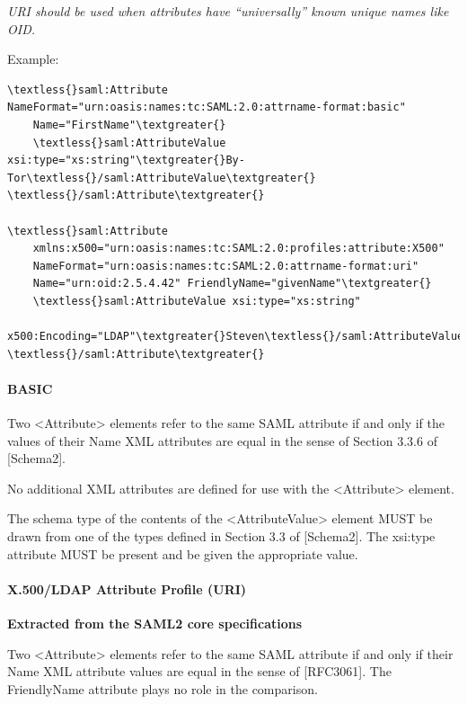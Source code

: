 \documentclass[letterpaper,10pt,english]{sphinxmanual}
\begin{document}
\emph{URI should be used when attributes have ``universally'' known unique names
like OID.}

Example:

\begin{Verbatim}[commandchars=\\\{\}]
\textless{}saml:Attribute NameFormat="urn:oasis:names:tc:SAML:2.0:attrname-format:basic"
    Name="FirstName"\textgreater{}
    \textless{}saml:AttributeValue xsi:type="xs:string"\textgreater{}By-Tor\textless{}/saml:AttributeValue\textgreater{}
\textless{}/saml:Attribute\textgreater{}

\textless{}saml:Attribute
    xmlns:x500="urn:oasis:names:tc:SAML:2.0:profiles:attribute:X500"
    NameFormat="urn:oasis:names:tc:SAML:2.0:attrname-format:uri"
    Name="urn:oid:2.5.4.42" FriendlyName="givenName"\textgreater{}
    \textless{}saml:AttributeValue xsi:type="xs:string"
        x500:Encoding="LDAP"\textgreater{}Steven\textless{}/saml:AttributeValue\textgreater{}
\textless{}/saml:Attribute\textgreater{}
\end{Verbatim}


\paragraph{BASIC}
\label{attribute_management:basic}
Two \textless{}Attribute\textgreater{} elements refer to the same SAML attribute if and only if the
values of their Name XML attributes are equal in the sense of Section 3.3.6 of
{[}Schema2{]}.

No additional XML attributes are defined for use with the \textless{}Attribute\textgreater{} element.

The schema type of the contents of the \textless{}AttributeValue\textgreater{} element MUST be drawn
from one of the types defined in Section 3.3 of {[}Schema2{]}. The xsi:type
attribute MUST be present and be given the appropriate value.


\paragraph{X.500/LDAP Attribute Profile (URI)}
\label{attribute_management:x-500-ldap-attribute-profile-uri}
\textbf{Extracted from the SAML2 core specifications}

Two \textless{}Attribute\textgreater{} elements refer to the same SAML attribute if and only if their
Name XML attribute values are equal in the sense of {[}RFC3061{]}. The
FriendlyName attribute plays no role in the comparison.
\end{document}

